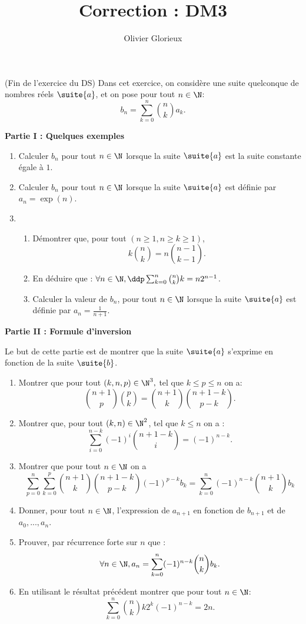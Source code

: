 \documentclass[a4paper, 11pt,reqno]{article}
\author{Olivier Glorieux}
\begin{document}
\title{Correction :  DM3 \\
}
\begin{exercice}(Fin de l'exercice du DS) 
Dans cet exercice, on considère une suite quelconque de nombres réels $\suite{a}$, et on pose pour tout $n\in \N$:
$$b_n =\sum_{k=0}^n \binom{n}{k} a_k.$$
\begin{center}
\textbf{Partie I : Quelques exemples}
\end{center}
\begin{enumerate}
\item Calculer $b_n$ pour tout $n \in \N$ lorsque la suite $\suite{a}$ est la suite constante égale à $1$.
\item Calculer $b_n$ pour tout $n \in \N$ lorsque la suite $\suite{a}$ est définie par $a_n=\exp(n)$. 

\item 
\begin{enumerate}
\item Démontrer que, pour tout $(n\geq 1,n\geq k\geq 1)$, $$k\binom{n}{k}=n \binom{n-1}{k-1}.$$
\item En déduire que : $\forall n \in \N, \ddp \sum_{k=0}^n \binom{n}{k} k = n2^{n-1}$.
\item Calculer la valeur de $b_n$, pour tout $n \in \N$ lorsque la suite $\suite{a}$ est définie par $a_n=\frac{1}{n+1}$. 
\end{enumerate}
\end{enumerate}
\begin{center}
\textbf{Partie II : Formule d'inversion }
\end{center}
Le  but de cette partie est de montrer que la suite $\suite{a}$ s'exprime en fonction de la suite $\suite{b}$. 
\begin{enumerate}
\item Montrer que pour tout $(k, n , p ) \in \N^3,$ tel que $k\leq p \leq n$ on  a:
$$\binom{n+1}{p}\binom{p}{k}=\binom{n+1}{k}\binom{n+1-k}{p-k}.$$
\item Montrer que, pour tout $(k,n) \in \N^2$, tel que $k\leq n$ on  a :
$$\sum_{i=0}^{n-k} (-1)^i  \binom{n+1-k}{i}=(-1)^{n-k}.$$ 
\item  Montrer que pour tout $n\in \N$ on a $$\sum_{p=0}^{n}\sum_{k=0}^p  \binom{n+1}{k}\binom{n+1-k}{p-k} (-1)^{p-k}  b_k	 = \sum_{k=0}^{n} (-1)^{n-k}  \binom{n+1}{k} b_k $$
\item Donner, pour tout $n\in \N$, l'expression de $a_{n+1}$ en fonction de $b_{n+1}$ et de $a_0, ..., a_n$. 
\item Prouver, par récurrence forte sur $n$ que :
$$\forall n \in \N, a_n =\sum_{k=0}^n (-1)^{n-k} \binom{n}{k} b_k.$$
\item En utilisant le résultat précédent montrer que pour tout $n\in \N$:
$$\sum_{k=0}^{n}   \binom{n}{k}k2^k(-1)^{n-k}=2n.$$ 
\end{enumerate}




\end{exercice}
\end{document}
